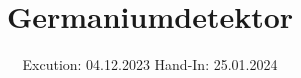 

\subject{V18}
\title{Germaniumdetektor}
\date{%
  Excution: 04.12.2023
  \hspace{3em}
  Hand-In: 25.01.2024
}



\maketitle
\setcounter{page}{1}







\printbibliography{}


